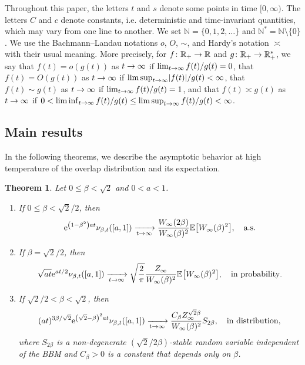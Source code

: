 \documentclass[10pt]{amsart}
\newtheorem{theo}{Theorem}[section]
\theoremstyle{definition}\newtheorem{defi}[theo]{Definition}\newtheorem{rema}[theo]{Remark}\newtheorem{exam}[theo]{Example}\newtheorem{exem}[theo]{Example}\newtheorem{nota}[theo]{Notation}
\newcommand{\e}{\mathrm{e}}
\newcommand{\N}{\mathbb{N}}
\newcommand{\R}{\mathbb{R}}
\newcommand\1{\mathds{1}}
\newcommand{\Expec}[1]{\mathbb{E}\left[#1\right]}
\newcommand{\abs}[1]{\left\lvert#1\right\rvert}
\newcommand*{\relabel}{\renewcommand{\labelenumi}{(\theenumi)}}
\newcommand*{\romanenumi}{\renewcommand*{\theenumi}{\roman{enumi}}\relabel}
\let\originalleft\left
\let\originalright\right
\renewcommand{\left}{\mathopen{}\mathclose\bgroup\originalleft}
\renewcommand{\right}{\aftergroup\egroup\originalright}
\renewcommand*{\to}{\mathchoice{\longrightarrow}{\rightarrow}{\rightarrow}{\rightarrow}}
\begin{document}
Throughout this paper, the letters $t$ and $s$ denote some points in time $[0, \infty)$. The letters $C$ and $c$ denote constants, i.e. deterministic and time-invariant quantities, which may vary from one line to another. We set $\N = \{0,1,2,\dots\}$ and $\N^* = \N \setminus \{0\}$. We use the Bachmann--Landau notations $o$, $O$, $\sim$, and Hardy's notation $\asymp$ with their usual meaning. More precisely, for $f \colon \R_+ \to \R$ and $g \colon \R_+ \to \R_+^*$, we say that $f(t) = o(g(t))$ as $t \to \infty$ if $\lim_{t\to\infty} f(t)/g(t) = 0$, that $f(t) = O(g(t))$ as $t \to \infty$ if $\limsup_{t\to\infty} \abs{f(t)}/g(t) < \infty$, that $f(t) \sim g(t)$ as $t \to \infty$ if $\lim_{t\to\infty} f(t)/g(t) = 1$, and that $f(t) \asymp g(t)$ as $t \to \infty$ if $0 < \liminf_{t\to\infty} f(t)/g(t) \leq \limsup_{t\to\infty} f(t)/g(t) < \infty$.

\subsection{Main results}

In the following theorems, we describe the asymptotic behavior at high temperature of the overlap distribution and its expectation.

\begin{theo}\label{thm:asymptotics_of_the_overlap_distribution}
Let $0 \leq \beta < \sqrt{2}$ and $0 < a < 1$.
\begin{enumerate}\romanenumi
\item\label{it:asymptotics_of_the_overlap_distribution_1}
If $0 \leq \beta < \sqrt{2}/2$, then
\begin{equation*}
\e^{\left(1 - \beta^2\right)at} \nu_{\beta, t}([a, 1]) \xrightarrow[t \to \infty]{} \frac{W_\infty(2\beta)}{W_\infty(\beta)^2} \Expec{W_\infty(\beta)^2}, \quad \text{a.s.}
\end{equation*}
\item\label{it:asymptotics_of_the_overlap_distribution_2}
If $\beta = \sqrt{2}/2$, then
\begin{equation*}
\sqrt{at} \e^{at/2} \nu_{\beta, t}([a, 1]) \xrightarrow[t \to \infty]{} \sqrt{\frac{2}{\pi}} \frac{Z_\infty}{W_\infty(\beta)^2} \Expec{W_\infty(\beta)^2}, \quad \text{in probability}.
\end{equation*}
\item\label{it:asymptotics_of_the_overlap_distribution_3}
If $\sqrt{2}/2 < \beta < \sqrt{2}$, then
\begin{equation*}
(at)^{3 \beta/\sqrt{2}} \e^{\left(\sqrt{2} - \beta\right)^2 at} \nu_{\beta, t}([a, 1]) \xrightarrow[t \to \infty]{} \frac{C_\beta Z_\infty^{\sqrt{2}\beta}}{W_\infty(\beta)^2} S_{2\beta}, \quad \text{in distribution},
\end{equation*}
where $S_{2\beta}$ is a non-degenerate $(\sqrt{2}/2\beta)$-stable random variable independent of the BBM and $C_\beta > 0$ is a constant that depends only on $\beta$.
\end{enumerate}
\end{theo}
\end{document}
